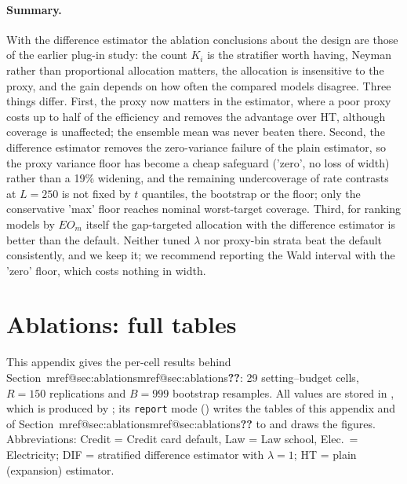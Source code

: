 \documentclass[pdflatex,sn-mathphys-num,iicol]{sn-jnl}
\makeatletter
\theoremstyle{thmstyleone}
\theoremstyle{thmstyletwo}
\theoremstyle{thmstylethree}
\newcommand{\Mref}[1]{\ifcsname mref@#1\endcsname\csname mref@#1\endcsname\else\textbf{??}\fi}
\makeatother
\begin{document}
\paragraph{Summary.} With the difference estimator the ablation conclusions about the design are those of the earlier plug-in study: the count $K_i$ is the stratifier worth having, Neyman rather than proportional allocation matters, the allocation is insensitive to the proxy, and the gain depends on how often the compared models disagree. Three things differ. First, the proxy now matters in the estimator, where a poor proxy costs up to half of the efficiency and removes the advantage over HT, although coverage is unaffected; the ensemble mean was never beaten there. Second, the difference estimator removes the zero-variance failure of the plain estimator, so the proxy variance floor has become a cheap safeguard ('zero', no loss of width) rather than a 19\% widening, and the remaining undercoverage of rate contrasts at $L=250$ is not fixed by $t$ quantiles, the bootstrap or the floor; only the conservative 'max' floor reaches nominal worst-target coverage. Third, for ranking models by $EO_m$ itself the gap-targeted allocation with the difference estimator is better than the default. Neither tuned $\lambda$ nor proxy-bin strata beat the default consistently, and we keep it; we recommend reporting the Wald interval with the 'zero' floor, which costs nothing in width.

\section{Ablations: full tables}
\label{sec:app-ablations}\label{si:ablation-tables}

This appendix gives the per-cell results behind Section~\Mref{sec:ablations}: 29 setting--budget cells, $R=150$ replications and $B=999$ bootstrap resamples. All values are stored in
, which is produced by ; its \texttt{report} mode () writes the tables of this appendix and of Section~\Mref{sec:ablations} to  and draws the figures. Abbreviations: Credit = Credit card default, Law = Law school, Elec.\ = Electricity; DIF = stratified difference estimator with $\lambda=1$; HT = plain (expansion) estimator.
\end{document}
